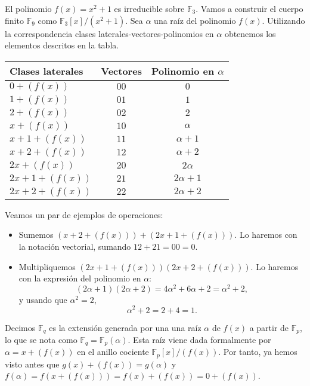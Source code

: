 \begin{example}
  El polinomio \(f(x) = x^2 + 1\) es irreducible sobre \(\mathbb F_3\).
  Vamos a construir el cuerpo finito \(\mathbb F_9\) como \(\mathbb F_3[x]/(x^2 + 1)\).
  Sea \(\alpha\) una raíz del polinomio \(f(x)\).
  Utilizando la correspondencia clases laterales-vectores-polinomios en \(\alpha\) obtenemos los elementos descritos en la tabla.
  \begin{table}[h]
    \centering
    \sffamily
    \begin{tabular}{lcc}
      \toprule
      Clases laterales & Vectores & Polinomio en \(\alpha\)\\
      \midrule
      \(0 + (f(x))\) & \(00\) & \(0\)\\
      \(1 + (f(x))\) & \(01\) & \(1\)\\
      \(2 + (f(x))\) & \(02\) & \(2\)\\
      \(x + (f(x))\) & \(10\) & \(\alpha\)\\
      \(x + 1 + (f(x))\) & \(11\) & \(\alpha + 1\)\\
      \(x + 2 + (f(x))\) & \(12\) & \(\alpha + 2\)\\
      \(2x + (f(x))\) & \(20\) & \(2\alpha\)\\
      \(2x + 1 + (f(x))\) & \(21\) & \(2\alpha + 1\)\\
      \(2x + 2 + (f(x))\) & \(22\) & \(2\alpha + 2\)\\
      \bottomrule
    \end{tabular}
  \end{table}
  Veamos un par de ejemplos de operaciones: \begin{itemize}
    \item Sumemos \((x + 2 + (f(x))) + (2x + 1 + (f(x)))\). Lo haremos con la notación vectorial, sumando \(12 + 21 = 00 = 0\).
    \item Multipliquemos \((2x + 1 + (f(x)))(2x + 2 + (f(x)))\). Lo haremos con la expresión del polinomio en \(\alpha\):
    \[
      (2\alpha + 1)(2\alpha + 2) = 4\alpha^2 + 6\alpha + 2 = \alpha^2 + 2,
    \]
    y usando que \(\alpha^2 = 2\), 
    \[
      \alpha^2 + 2 = 2 + 4 = 1.
    \]
  \end{itemize}
\end{example}

Decimos \(\mathbb F_q\) es la extensión generada por una una raíz \(\alpha\) de \(f(x)\) a partir de \(\mathbb F_p\), lo que se nota como \(\mathbb F_q = \mathbb F_p(\alpha)\).
Esta raíz viene dada formalmente por \(\alpha = x + (f(x))\) en el anillo cociente \(\mathbb F_p[x]/(f(x))\).
Por tanto, ya hemos visto antes que \(g(x) + (f(x)) = g(\alpha)\) y \(f(\alpha) = f(x + (f(x))) = f(x) + (f(x)) = 0 + (f(x))\).


